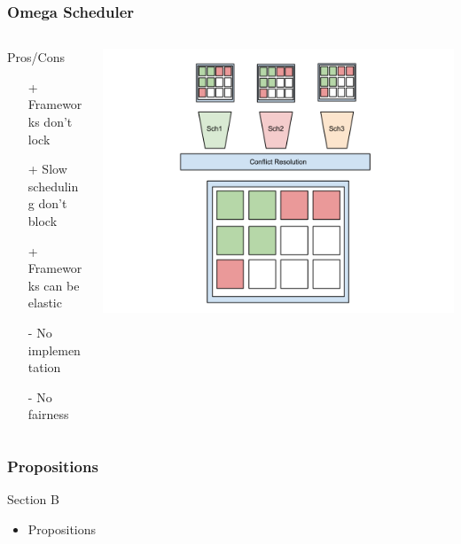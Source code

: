 \documentclass[notes=hide]{beamer}
\begin{document}
  \note{}


  \begin{frame}
    \frametitle{Omega Scheduler}
       \begin{columns}[T]
       \begin{column}{.5\textwidth}
        \begin{block}{Pros/Cons}
            \begin{itemize}
              \item[+] Frameworks don't lock
              \item[+] Slow scheduling don't block
              \item[+] Frameworks can be elastic 
              \item[-] No implementation 
              \item[-] No fairness 
            \end{itemize}
         \end{block}
       \end{column}
       \begin{column}{.6\textwidth}
         \includegraphics[trim = 50mm 0mm 0mm 0mm,clip,scale=0.30,natwidth=960,natheight=720]{Omega.png}
       \end{column}
       \end{columns}
  \end{frame}

  \note{}


  \begin{frame}
    \frametitle{Propositions}
    \begin{block}{Section B}
    \begin{itemize}
         \item Propositions
    \end{itemize}
     \end{block}
  \end{frame}
\end{document}
